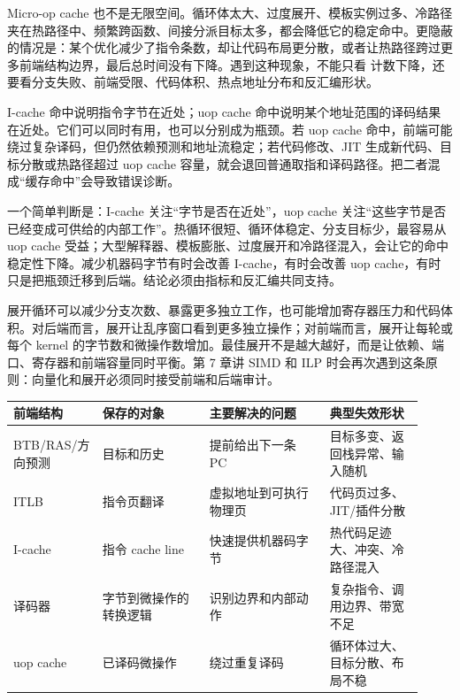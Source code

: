 Micro-op cache 也不是无限空间。循环体太大、过度展开、模板实例过多、冷路径夹在热路径中、频繁跨函数、间接分派目标太多，都会降低它的稳定命中。更隐蔽的情况是：某个优化减少了指令条数，却让代码布局更分散，或者让热路径跨过更多前端结构边界，最后总时间没有下降。遇到这种现象，不能只看  计数下降，还要看分支失败、前端受限、代码体积、热点地址分布和反汇编形状。

I-cache 命中说明指令字节在近处；uop cache 命中说明某个地址范围的译码结果在近处。它们可以同时有用，也可以分别成为瓶颈。若 uop cache 命中，前端可能绕过复杂译码，但仍然依赖预测和地址流稳定；若代码修改、JIT 生成新代码、目标分散或热路径超过 uop cache 容量，就会退回普通取指和译码路径。把二者混成“缓存命中”会导致错误诊断。

一个简单判断是：I-cache 关注“字节是否在近处”，uop cache 关注“这些字节是否已经变成可供给的内部工作”。热循环很短、循环体稳定、分支目标少，最容易从 uop cache 受益；大型解释器、模板膨胀、过度展开和冷路径混入，会让它的命中稳定性下降。减少机器码字节有时会改善 I-cache，有时会改善 uop cache，有时只是把瓶颈迁移到后端。结论必须由指标和反汇编共同支持。

展开循环可以减少分支次数、暴露更多独立工作，也可能增加寄存器压力和代码体积。对后端而言，展开让乱序窗口看到更多独立操作；对前端而言，展开让每轮或每个 kernel 的字节数和微操作数增加。最佳展开不是越大越好，而是让依赖、端口、寄存器和前端容量同时平衡。第 7 章讲 SIMD 和 ILP 时会再次遇到这条原则：向量化和展开必须同时接受前端和后端审计。

\begin{center}
\small
\begin{tabular}{@{}p{0.20\linewidth}p{0.24\linewidth}p{0.27\linewidth}p{0.21\linewidth}@{}}
\toprule
前端结构 & 保存的对象 & 主要解决的问题 & 典型失效形状 \\
\midrule
BTB/RAS/方向预测 & 目标和历史 & 提前给出下一条 PC & 目标多变、返回栈异常、输入随机 \\
ITLB & 指令页翻译 & 虚拟地址到可执行物理页 & 代码页过多、JIT/插件分散 \\
I-cache & 指令 cache line & 快速提供机器码字节 & 热代码足迹大、冲突、冷路径混入 \\
译码器 & 字节到微操作的转换逻辑 & 识别边界和内部动作 & 复杂指令、调用边界、带宽不足 \\
uop cache & 已译码微操作 & 绕过重复译码 & 循环体过大、目标分散、布局不稳 \\
\bottomrule
\end{tabular}
\end{center}

